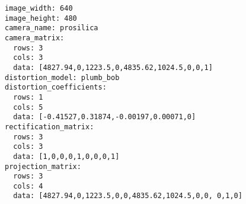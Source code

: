 \begin{lstlisting}[caption=Resultado de la calibración en ROS de ejemplo para cámaras monoculares, label=lst:monocularyaml]
image_width: 640
image_height: 480
camera_name: prosilica
camera_matrix:
  rows: 3
  cols: 3
  data: [4827.94,0,1223.5,0,4835.62,1024.5,0,0,1]
distortion_model: plumb_bob
distortion_coefficients:
  rows: 1
  cols: 5
  data: [-0.41527,0.31874,-0.00197,0.00071,0]
rectification_matrix:
  rows: 3
  cols: 3
  data: [1,0,0,0,1,0,0,0,1]
projection_matrix:
  rows: 3
  cols: 4
  data: [4827.94,0,1223.5,0,0,4835.62,1024.5,0,0, 0,1,0]
\end{lstlisting}
